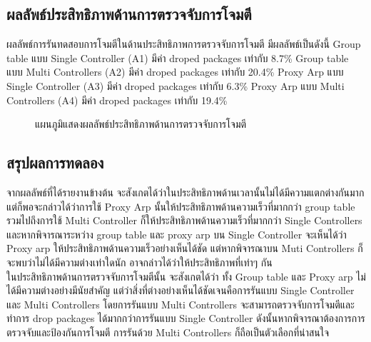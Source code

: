 \subsection{ผลลัพธ์ประสิทธิภาพด้านการตรวจจับการโจมตี}
\indent\indent
ผลลัพธ์การรันทดสอบการโจมตีในด้านประสิทธิภาพการตรวจจับการโจมตี มีผลลัพธ์เป็นดังนี้ 
Group table แบบ Single Controller (A1) มีค่า droped packages เท่ากับ 8.7\%
Group table แบบ Multi Controllers (A2) มีค่า droped packages เท่ากับ 20.4\%
Proxy Arp แบบ Single Controller (A3) มีค่า droped packages เท่ากับ 6.3\%
Proxy Arp แบบ Multi Controllers (A4) มีค่า droped packages เท่ากับ 19.4\%
\\
\begin{figure}[h!]
    \centering
    \caption{แผนภูมิแสดงผลลัพธ์ประสิทธิภาพด้านการตรวจจับการโจมตี}
\end{figure}
\pagebreak
\subsection{สรุปผลการทดลอง}
\indent\indent
จากผลลัพธ์ที่ได้รายงานข้างต้น จะสังเกตได้ว่าในประสิทธิภาพด้านเวลานั้นไม่ได้มีความแตกต่างกันมาก แต่ก็พอจะกล่าวได้ว่าการใช้ Proxy Arp นั้นให้ประสิทธิภาพด้านความเร็วที่มากกว่า group table รวมไปถึงการใช้ Multi Controller ก็ให้ประสิทธิภาพด้านความเร็วที่มากกว่า Single Controllers 
และหากพิจารณาระหว่าง group table และ proxy arp บน Single Controller จะเห็นได้ว่า Proxy arp ให้ประสิทธิภาพด้านความเร็วอย่างเห็นได้ชัด
แต่หากพิจารณาบน Muti Controllers ก็จะพบว่าไม่ได้มีความต่างเท่าใดนัก อาจกล่าวได้ว่าให้ประสิทธิภาพที่เท่าๆ กัน
\\\indent
ในประสิทธิภาพด้านการตรวจจับการโจมตีนั้น จะสังเกตได้ว่า ทั้ง Group table และ Proxy arp ไม่ได้มีความต่างอย่างมีนัยสำคัญ แต่ว่าสิ่งที่ต่างอย่างเห็นได้ชัดเจนคือการรันแบบ Single Controller และ Multi Controllers โดยการรันแบบ Multi Controllers จะสามารถตรวจจับการโจมตีและทำการ drop packages ได้มากกว่าการรันแบบ Single Controller 
ดังนั้นหากพิจารณาต้องการการตรวจจับและป้องกันการโจมตี การรันด้วย Multi Controllers ก็ถือเป็นตัวเลือกที่น่าสนใจ
\\
